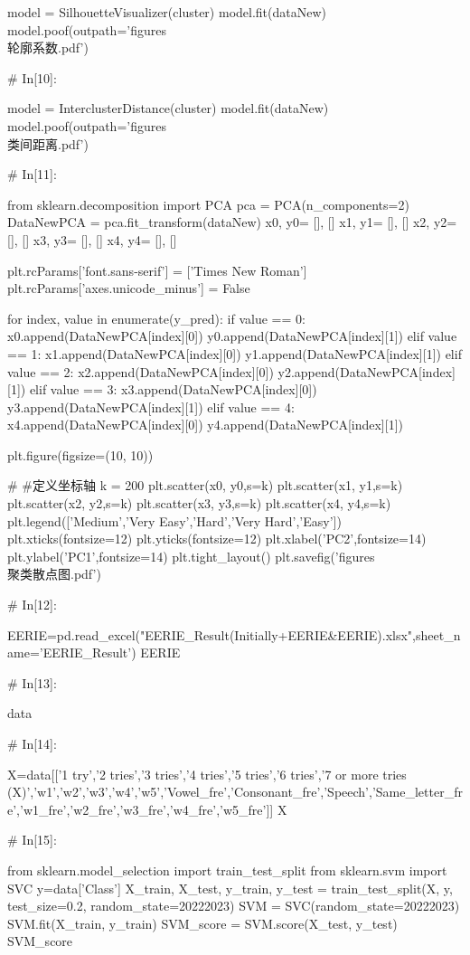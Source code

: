 \documentclass{MathModeling}
\begin{document}
\begin{python}
model = SilhouetteVisualizer(cluster)
model.fit(dataNew)
model.poof(outpath='figures\\轮廓系数.pdf')


# In[10]:


model = InterclusterDistance(cluster)
model.fit(dataNew)
model.poof(outpath='figures\\类间距离.pdf')


# In[11]:


from sklearn.decomposition import PCA
pca = PCA(n_components=2)
DataNewPCA = pca.fit_transform(dataNew)
x0, y0= [], []
x1, y1= [], []
x2, y2= [], []
x3, y3= [], []
x4, y4= [], []

plt.rcParams['font.sans-serif'] = ['Times New Roman']
plt.rcParams['axes.unicode_minus'] = False

for index, value in enumerate(y_pred):
    if value == 0:
        x0.append(DataNewPCA[index][0])
        y0.append(DataNewPCA[index][1])
    elif value == 1:
        x1.append(DataNewPCA[index][0])
        y1.append(DataNewPCA[index][1])
    elif value == 2:
        x2.append(DataNewPCA[index][0])
        y2.append(DataNewPCA[index][1])
    elif value == 3:
        x3.append(DataNewPCA[index][0])
        y3.append(DataNewPCA[index][1])
    elif value == 4:
        x4.append(DataNewPCA[index][0])
        y4.append(DataNewPCA[index][1])

plt.figure(figsize=(10, 10))

# #定义坐标轴
k = 200
plt.scatter(x0, y0,s=k)
plt.scatter(x1, y1,s=k)
plt.scatter(x2, y2,s=k)
plt.scatter(x3, y3,s=k)
plt.scatter(x4, y4,s=k)
plt.legend(['Medium','Very Easy','Hard','Very Hard','Easy'])
plt.xticks(fontsize=12)
plt.yticks(fontsize=12)
plt.xlabel('PC2',fontsize=14)
plt.ylabel('PC1',fontsize=14)
plt.tight_layout()
plt.savefig('figures\\聚类散点图.pdf')


# In[12]:


EERIE=pd.read_excel("EERIE_Result(Initially+EERIE&EERIE).xlsx",sheet_name='EERIE_Result')
EERIE


# In[13]:


data


# In[14]:


X=data[['1 try','2 tries','3 tries','4 tries','5 tries','6 tries','7 or more tries (X)','w1','w2','w3','w4','w5','Vowel_fre','Consonant_fre','Speech','Same_letter_fre','w1_fre','w2_fre','w3_fre','w4_fre','w5_fre']]
X


# In[15]:


from sklearn.model_selection import train_test_split
from sklearn.svm import SVC
y=data['Class']
X_train, X_test, y_train, y_test = train_test_split(X, y, test_size=0.2, random_state=20222023)
SVM = SVC(random_state=20222023)
SVM.fit(X_train, y_train)
SVM_score = SVM.score(X_test, y_test)
SVM_score



\end{python}
\end{document}
